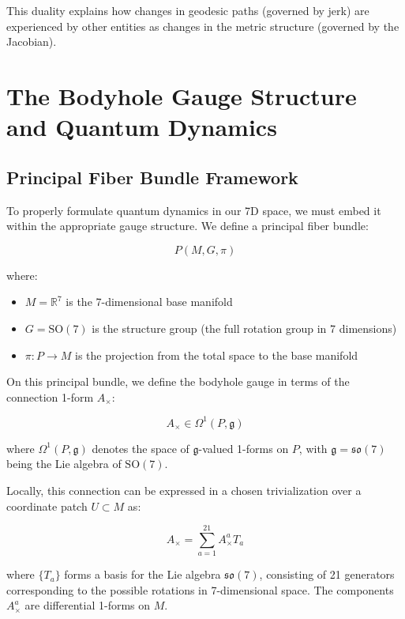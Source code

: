 \documentclass{article}
\begin{document}
This duality explains how changes in geodesic paths (governed by jerk) are experienced by other entities as changes in the metric structure (governed by the Jacobian).

\section{The Bodyhole Gauge Structure and Quantum Dynamics}

\subsection{Principal Fiber Bundle Framework}

To properly formulate quantum dynamics in our 7D space, we must embed it within the appropriate gauge structure. We define a principal fiber bundle:

\begin{equation}
P(M, G, \pi)
\end{equation}

where:
\begin{itemize}
\item $M = \mathbb{R}^7$ is the 7-dimensional base manifold
\item $G = \text{SO}(7)$ is the structure group (the full rotation group in 7 dimensions)
\item $\pi: P \rightarrow M$ is the projection from the total space to the base manifold
\end{itemize}

On this principal bundle, we define the bodyhole gauge in terms of the connection 1-form $A_\times$:

\begin{equation}
A_\times \in \Omega^1(P, \mathfrak{g})
\end{equation}

where $\Omega^1(P, \mathfrak{g})$ denotes the space of $\mathfrak{g}$-valued 1-forms on $P$, with $\mathfrak{g} = \mathfrak{so}(7)$ being the Lie algebra of $\text{SO}(7)$.

Locally, this connection can be expressed in a chosen trivialization over a coordinate patch $U \subset M$ as:

\begin{equation}
A_\times = \sum_{a=1}^{21} A^a_\times T_a
\end{equation}

where $\{T_a\}$ forms a basis for the Lie algebra $\mathfrak{so}(7)$, consisting of 21 generators corresponding to the possible rotations in 7-dimensional space. The components $A^a_\times$ are differential 1-forms on $M$.
\end{document}

